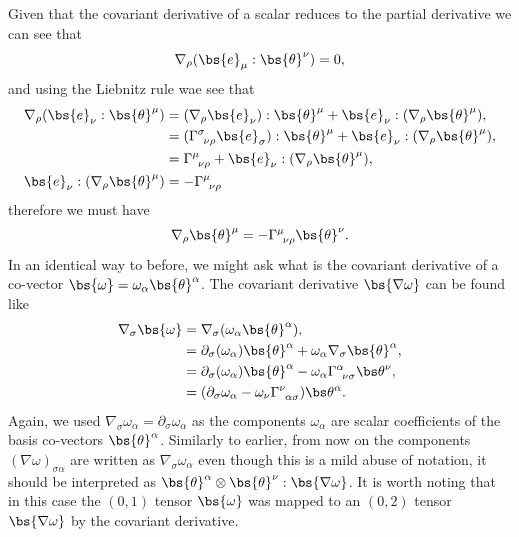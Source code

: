 Given that the covariant derivative of a scalar reduces to the partial derivative we can see that 
\begin{equation}
\nabla_\rho (\bs{e}_\mu : \bs{\theta}^\nu) = 0,
\end{equation}
and using the Liebnitz rule wae see that 
\begin{align}
\nabla_\rho (\bs{e}_\nu : \bs{\theta}^\mu) &= (\nabla_\rho \bs{e}_\nu):\bs{\theta}^\mu + \bs{e}_\nu:(\nabla_\rho \bs{\theta}^\mu),\\
 &= (\Gamma^\sigma_{\,\,\,\nu\rho}\bs{e}_\sigma):\bs{\theta}^\mu + \bs{e}_\nu:(\nabla_\rho \bs{\theta}^\mu),\\
  &= \Gamma^\mu_{\,\,\,\nu\rho} + \bs{e}_\nu:(\nabla_\rho \bs{\theta}^\mu),\\
  \bs{e}_\nu:(\nabla_\rho \bs{\theta}^\mu) &= -\Gamma^\mu_{\,\,\,\nu\rho}
\end{align}
therefore we must have 
\begin{equation}
\nabla_\rho \bs{\theta}^\mu = -\Gamma^\mu_{\,\,\,\nu\rho} \bs{\theta}^\nu.
\end{equation}
In an identical way to before, we might ask what is the covariant derivative of a co-vector $\bs{\omega}=\omega_\alpha \bs{\theta}^\alpha$. The covariant derivative $\bs{\nabla \omega}$ can be found like
\begin{align}
\nabla_\sigma \bs {\omega} &= \nabla_\sigma(\omega_\alpha \bs{\theta}^\alpha),\\
&= \partial_\sigma(\omega_\alpha) \bs{\theta}^\alpha + \omega_\alpha  \nabla_\sigma \bs{\theta}^\alpha,\\
&= \partial_\sigma(\omega_\alpha) \bs{\theta}^\alpha - \omega_\alpha \Gamma^\alpha_{\,\,\,\nu\sigma} \bs\theta^\nu ,\\
&= (\partial_\sigma\omega_\alpha  - \omega_\nu \Gamma^\nu_{\,\,\,\alpha\sigma} )\bs\theta^\alpha .
\end{align}
Again, we used $\nabla_\sigma \omega_\alpha = \partial_\sigma \omega_\alpha$ as the components $\omega_\alpha$ are scalar coefficients of the basis co-vectors $\bs{\theta}^\alpha$. Similarly to earlier, from now on the components $(\nabla \omega)_{\sigma\alpha} $ are written as $ \nabla_\sigma \omega_\alpha$ even though this is a mild abuse of notation, it should be interpreted as $\bs{\theta}^\alpha \otimes \bs{\theta}^\nu : \bs{\nabla \omega}$. It is worth noting that in this case the $(0,1)$ tensor $\bs{\omega}$ was mapped to an $(0,2)$ tensor $\bs{\nabla \omega}$ by the covariant derivative.

